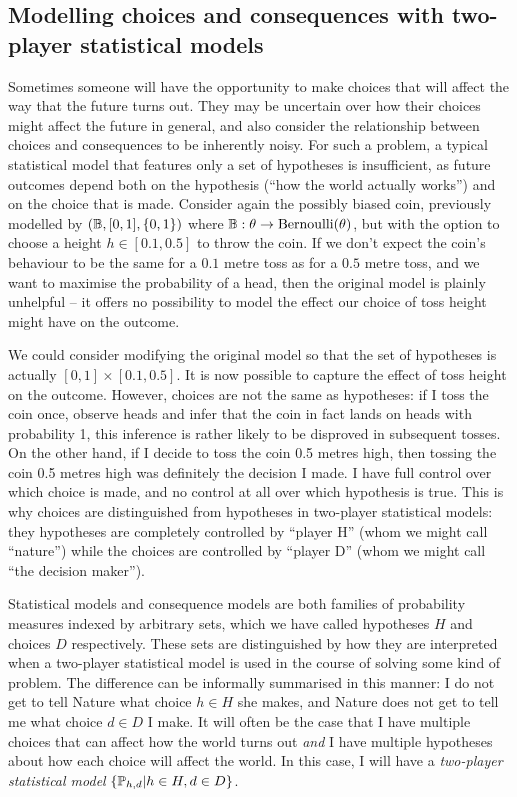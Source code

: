 \subsection{Modelling choices and consequences with two-player statistical models}

Sometimes someone will have the opportunity to make choices that will affect the way that the future turns out. They may be uncertain over how their choices might affect the future in general, and also consider the relationship between choices and consequences to be inherently noisy. For such a problem, a typical statistical model that features only a set of hypotheses is insufficient, as future outcomes depend both on the hypothesis (``how the world actually works'') and on the choice that is made. Consider again the possibly biased coin, previously modelled by $(\mathbb{B},[0,1],\{0,1\})$ where $\mathbb{B}:\theta\to\text{Bernoulli}(\theta)$, but with the option to choose a height $h\in [0.1,0.5]$ to throw the coin. If we don't expect the coin's behaviour to be the same for a $0.1$ metre toss as for a $0.5$ metre toss, and we want to maximise the probability of a head, then the original model is plainly unhelpful -- it offers no possibility to model the effect our choice of toss height might have on the outcome.

We could consider modifying the original model so that the set of hypotheses is actually $[0,1]\times[0.1,0.5]$. It is now possible to capture the effect of toss height on the outcome. However, choices are not the same as hypotheses: if I toss the coin once, observe heads and infer that the coin in fact lands on heads with probability 1, this inference is rather likely to be disproved in subsequent tosses. On the other hand, if I decide to toss the coin 0.5 metres high, then tossing the coin 0.5 metres high was definitely the decision I made. I have full control over which choice is made, and no control at all over which hypothesis is true. This is why choices are distinguished from hypotheses in two-player statistical models: they hypotheses are completely controlled by ``player H'' (whom we might call ``nature'') while the choices are controlled by ``player D'' (whom we might call ``the decision maker'').

Statistical models and consequence models are both families of probability measures indexed by arbitrary sets, which we have called hypotheses $H$ and choices $D$ respectively. These sets are distinguished by how they are interpreted when a two-player statistical model is used in the course of solving some kind of problem. The difference can be informally summarised in this manner: I do not get to tell Nature what choice $h\in H$ she makes, and Nature does not get to tell me what choice $d\in D$ I make. It will often be the case that I have multiple choices that can affect how the world turns out \emph{and} I have multiple hypotheses about how each choice will affect the world. In this case, I will have a \emph{two-player statistical model} $\{\mathbb{P}_{h,d}|h\in H,d\in D\}$. 

